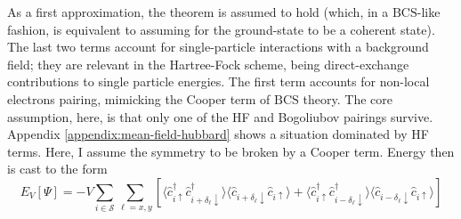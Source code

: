 As a first approximation, the theorem is assumed to hold (which, in a $\mathrm{BCS}$-like fashion, is equivalent to assuming for the ground-state to be a coherent state). The last two terms account for single-particle interactions with a background field; they are relevant in the Hartree-Fock scheme, being direct-exchange contributions to single particle energies. The first term accounts for non-local electrons pairing, mimicking the Cooper term of $\mathrm{BCS}$ theory. The core assumption, here, is that only one of the HF and Bogoliubov pairings survive. Appendix \ref{appendix:mean-field-hubbard} shows a situation dominated by HF terms. Here, I assume the symmetry to be broken by a Cooper term. Energy then is cast to the form
\[
	E_V[\Psi] = -V \sum_{i \in \mathcal{S}} \sum_{\ell = x,y}
	\left[
		\langle
			\hat c_{i\uparrow}^\dagger \hat c_{i + \delta_\ell \downarrow}^\dagger
		\rangle \langle	
			\hat c_{i + \delta_\ell \downarrow} \hat c_{i\uparrow} 
		\rangle + \langle 
			\hat c_{i\uparrow}^\dagger \hat c_{i - \delta_\ell \downarrow}^\dagger
		\rangle \langle	
			\hat c_{i - \delta_\ell \downarrow} \hat c_{i\uparrow} 
		\rangle
	\right]
\]

